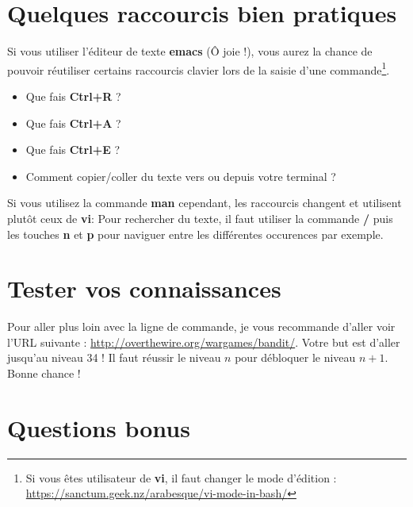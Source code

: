 \documentclass[11pt]{article}
\begin{document}
\section{Quelques raccourcis bien pratiques}

Si vous utiliser l'éditeur de texte \textbf{emacs} (Ô joie !), vous aurez la chance de pouvoir réutiliser certains raccourcis clavier lors de la saisie d'une commande\footnote{Si vous êtes utilisateur de \textbf{vi}, il faut changer le mode d'édition : \url{https://sanctum.geek.nz/arabesque/vi-mode-in-bash/}}.
\begin{itemize}
\item Que fais \textbf{Ctrl+R} ?
\item Que fais \textbf{Ctrl+A} ?
\item Que fais \textbf{Ctrl+E} ?
\item Comment copier/coller du texte vers ou depuis votre terminal ?
\end{itemize}

Si vous utilisez la commande \textbf{man} cependant, les raccourcis changent et utilisent plutôt ceux de \textbf{vi}: Pour rechercher du texte, il faut utiliser la commande \textbf{/} puis les touches \textbf{n} et \textbf{p} pour naviguer entre les différentes occurences par exemple.

\section{Tester vos connaissances}

Pour aller plus loin avec la ligne de commande, je vous recommande d'aller voir l'URL suivante : \url{http://overthewire.org/wargames/bandit/}. Votre but est d'aller jusqu'au niveau 34 ! Il faut réussir le niveau \(n\) pour débloquer le niveau \(n+1\). Bonne chance !

\section{Questions bonus}
\end{document}
